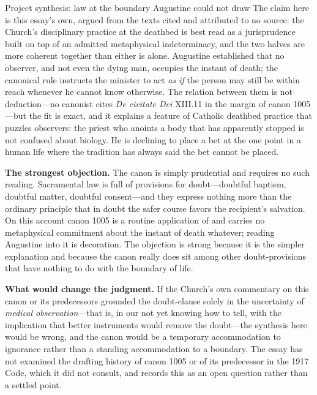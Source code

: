\begin{studybox}{Project synthesis: law at the boundary Augustine could not draw}
The claim here is this essay's own, argued from the texts cited and attributed to no source: the Church's disciplinary practice at the deathbed is best read as a jurisprudence built on top of an admitted metaphysical indeterminacy, and the two halves are more coherent together than either is alone. Augustine established that no observer, and not even the dying man, occupies the instant of death; the canonical rule instructs the minister to act \emph{as if} the person may still be within reach whenever he cannot know otherwise. The relation between them is not deduction---no canonist cites \emph{De civitate Dei} XIII.11 in the margin of canon 1005---but the fit is exact, and it explains a feature of Catholic deathbed practice that puzzles observers: the priest who anoints a body that has apparently stopped is not confused about biology. He is declining to place a bet at the one point in a human life where the tradition has always said the bet cannot be placed.

\medskip\noindent\textbf{The strongest objection.} The canon is simply prudential and requires no such reading. Sacramental law is full of provisions for doubt---doubtful baptism, doubtful matter, doubtful consent---and they express nothing more than the ordinary principle that in doubt the safer course favors the recipient's salvation. On this account canon 1005 is a routine application of  and carries no metaphysical commitment about the instant of death whatever; reading Augustine into it is decoration. The objection is strong because it is the simpler explanation and because the canon really does sit among other doubt-provisions that have nothing to do with the boundary of life.

\medskip\noindent\textbf{What would change the judgment.} If the Church's own commentary on this canon or its predecessors grounded the doubt-clause solely in the uncertainty of \emph{medical observation}---that is, in our not yet knowing how to tell, with the implication that better instruments would remove the doubt---the synthesis here would be wrong, and the canon would be a temporary accommodation to ignorance rather than a standing accommodation to a boundary. The essay has not examined the drafting history of canon 1005 or of its predecessor in the 1917 Code, which it did not consult, and records this as an open question rather than a settled point.
\end{studybox}


